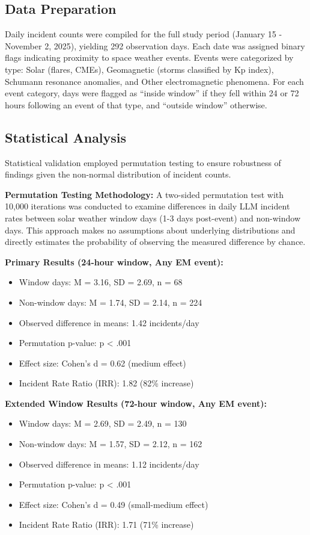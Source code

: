\documentclass[11pt,a4paper]{article}
\begin{document}
\subsection{Data Preparation}
Daily incident counts were compiled for the full study period (January 15 - November 2, 2025), yielding 292 observation days. Each date was assigned binary flags indicating proximity to space weather events.
Events were categorized by type: Solar (flares, CMEs), Geomagnetic (storms classified by Kp index), Schumann resonance anomalies, and Other electromagnetic phenomena.
For each event category, days were flagged as ``inside window'' if they fell within 24 or 72 hours following an event of that type, and ``outside window'' otherwise.

\subsection{Statistical Analysis}
Statistical validation employed permutation testing to ensure robustness of findings given the non-normal distribution of incident counts.

\textbf{Permutation Testing Methodology:}
A two-sided permutation test with 10,000 iterations was conducted to examine differences in daily LLM incident rates between solar weather window days (1-3 days post-event) and non-window days. This approach makes no assumptions about underlying distributions and directly estimates the probability of observing the measured difference by chance.

\textbf{Primary Results (24-hour window, Any EM event):}
\begin{itemize}
\item Window days: M = 3.16, SD = 2.69, n = 68
\item Non-window days: M = 1.74, SD = 2.14, n = 224
\item Observed difference in means: 1.42 incidents/day
\item Permutation p-value: p < .001
\item Effect size: Cohen's d = 0.62 (medium effect)
\item Incident Rate Ratio (IRR): 1.82 (82\% increase)
\end{itemize}

\textbf{Extended Window Results (72-hour window, Any EM event):}
\begin{itemize}
\item Window days: M = 2.69, SD = 2.49, n = 130
\item Non-window days: M = 1.57, SD = 2.12, n = 162
\item Observed difference in means: 1.12 incidents/day
\item Permutation p-value: p < .001
\item Effect size: Cohen's d = 0.49 (small-medium effect)
\item Incident Rate Ratio (IRR): 1.71 (71\% increase)
\end{itemize}
\end{document}
